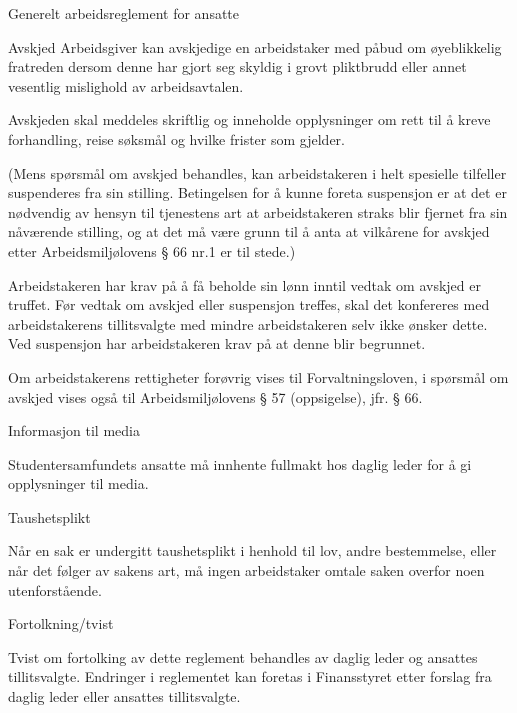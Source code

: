 \begin{lovkapittel}{Generelt arbeidsreglement for ansatte}
\begin{lovparagraf}{Avskjed}
Arbeidsgiver kan avskjedige en arbeidstaker med påbud om øyeblikkelig fratreden dersom denne har gjort seg skyldig
i grovt pliktbrudd eller annet vesentlig mislighold av arbeidsavtalen.

Avskjeden skal meddeles skriftlig og inneholde opplysninger om rett til å kreve forhandling, reise søksmål og hvilke
frister som gjelder.

(Mens spørsmål om avskjed behandles, kan arbeidstakeren i helt spesielle tilfeller suspenderes fra sin stilling.
Betingelsen for å kunne foreta suspensjon er at det er nødvendig av hensyn til tjenestens art at arbeidstakeren straks
blir fjernet fra sin nåværende stilling, og at det må være grunn til å anta at vilkårene for avskjed etter
Arbeidsmiljølovens § 66 nr.1 er til stede.)

Arbeidstakeren har krav på å få beholde sin lønn inntil vedtak om avskjed er truffet.
Før vedtak om avskjed eller suspensjon treffes, skal det konfereres med arbeidstakerens tillitsvalgte med mindre
arbeidstakeren selv ikke ønsker dette. Ved suspensjon har arbeidstakeren krav på at denne blir begrunnet.

Om arbeidstakerens rettigheter forøvrig vises til Forvaltningsloven, i spørsmål om avskjed vises også til
Arbeidsmiljølovens § 57 (oppsigelse), jfr. § 66.

  \end{lovparagraf}

  \begin{lovparagraf}{Informasjon til media}

Studentersamfundets ansatte må innhente fullmakt hos daglig leder for å gi opplysninger til media.

  \end{lovparagraf}

  \begin{lovparagraf}{Taushetsplikt}
  
Når en sak er undergitt taushetsplikt i henhold til lov, andre bestemmelse, eller når det følger av sakens art, må ingen
arbeidstaker omtale saken overfor noen utenforstående.

  \end{lovparagraf}

  \begin{lovparagraf}{Fortolkning/tvist}

Tvist om fortolking av dette reglement behandles av daglig leder og ansattes tillitsvalgte. Endringer i reglementet kan
foretas i Finansstyret etter forslag fra daglig leder eller ansattes tillitsvalgte.

  \end{lovparagraf}


\end{lovkapittel}


